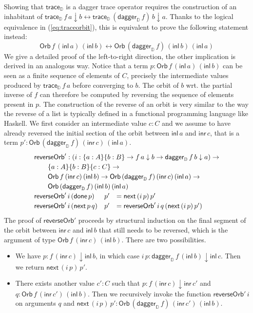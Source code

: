 \documentclass[runningheads,a4paper]{llncs}
\newcommand{\inl}{\mathsf{inl}}
\newcommand{\inr}{\mathsf{inr}}
\newcommand{\dn}{\downarrow}
\newcommand{\D}{\mathbb{D}}
\newcommand{\traceD}{\mathsf{trace}_\D}
\newcommand{\daggerD}{\mathsf{dagger}_\D}
\newcommand{\Orb}[3]{\mathsf{Orb}\,#1\,#2\,#3}
\newcommand{\done}{\mathsf{done}}
\renewcommand{\next}{\mathsf{next}}
\newcommand{\reverseOrbit}{\mathsf{reverseOrb}}
\begin{document}
Showing that $\traceD$ is a dagger trace operator requires the
construction of an inhabitant of $\traceD\,f\,a \dn b \leftrightarrow
\traceD\,(\daggerD\,f)\,b \dn a$. Thanks to the logical equivalence in
(\ref{eq:traceorbit}), this is equivalent to prove the following
statement instead: 
\[
\Orb f {(\inl\,a)} {(\inl\,b)} \leftrightarrow \Orb {(\daggerD\,f)} {(\inl\,b)} {(\inl\,a)}
\]
We give a detailed proof of the left-to-right direction, the other implication
is derived  in an analogous way.  Notice that a term
$p : \Orb f {(\inl\,a)} {(\inl\,b)}$ can be seen as a finite sequence
of elements of $C$, precisely the intermediate values produced by
$\traceD\,f\,a$ before converging to $b$. The orbit of $b$ wrt. the
partial inverse of $f$ can therefore be computed by reversing the
sequence of elements present in $p$. The construction of the reverse
of an orbit is very similar to the way the reverse of a list is
typically defined in a functional programming language like Haskell.
We first consider an intermediate value $c : C$ and we assume to have
already reversed the initial section of the orbit between $\inl\,a$
and $\inr\,c$, that is a term $p' : \Orb  {(\daggerD\,f)} {(\inr\,c)}
{(\inl\,a)}$. 
\[
\def\arraystretch{1.2}
\begin{array}{lll}
\multicolumn{3}{l}{\reverseOrbit' : (i : \{a : A\} \{b : B\} \to f \,a
\dn b \to \daggerD\,f  \,b \dn a) \to } \\
\multicolumn{3}{l}{\qquad \{a : A\} \{b : B\} \{c : C\} \to } \\
\multicolumn{3}{l}{\qquad \Orb f {(\inr\,c)}
 {(\inl\,b)} \to \Orb  {(\daggerD\,f)} {(\inr\,c)} {(\inl\,a)} \to } \\
\multicolumn{3}{l}{\qquad \Orb  {(\daggerD\,f)} {(\inl\,b)} {(\inl\,a)}}\\
\reverseOrbit' \,i\, (\done \,p) & p'&= \next\, (i \,p)\,p' \\
\reverseOrbit' \,i\,(\next\,p\,q) & p'&= \reverseOrbit' \,i\,q \,(\next \,(i\,p)\,p')
\end{array}
\]
The proof of $\reverseOrbit'$ proceeds by structural induction on the final
segment of the orbit between $\inr\,c$ and $\inl\,b$ that still needs
to be reversed, which is the argument of type
$\Orb f {(\inr\,c)} {(\inl\,b)}$. There are two possibilities.
\begin{itemize}
\item We have $p : f\,(\inr\,c) \dn
\inl\,b$, in which case $i\,p : \daggerD\,f\,(\inl\,b) \dn
\inl\,c$. Then we return $\next\,(i\,p)\,p'$.
\item There exists another value $c' : C$ such that $p :
  f\,(\inr\,c) \dn \inr\,c'$ and $q : \Orb f {(\inr\,c')}
  {(\inl\,b)}$. Then we recursively invoke the function
  $\reverseOrbit' \,i$ on arguments $q$ and $\next\,(i\,p)\,p' : \Orb
  {(\daggerD \,f)} {(\inr\,c')} {(\inl\,b)}$.
\end{itemize}
\end{document}
